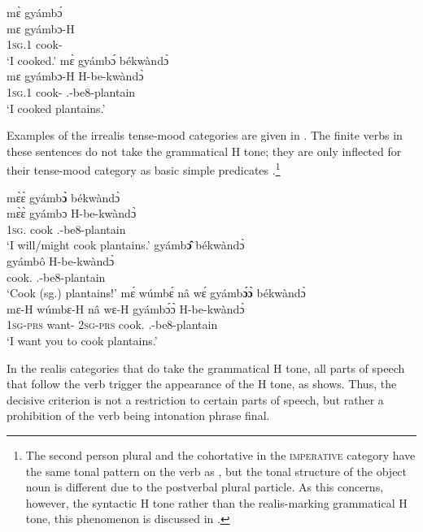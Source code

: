 \ea\label{metapst}
\ea  \label{metapst1}
  \glll  mɛ̀ gyámbɔ́  \\
          mɛ gyámbɔ-H \\
         1\textsc{sg}.{\PST}1 cook-{\PST}  \\
    \trans `I cooked.'
\ex\label{metapst2}
  \glll   mɛ̀ gyámbɔ́ békwàndɔ̀ \\
        mɛ gyámbɔ-H H-be-kwàndɔ̀ \\
          1\textsc{sg}.{\PST}1 cook-{\R} {\OBJ}.{\LINK}-be8-plantain\\
    \trans `I cooked plantains.'
\z
\z

Examples of the irrealis tense-mood categories are given in . The finite verbs in these sentences do not take the grammatical H tone; they are only inflected for their tense-mood category as basic simple predicates .\footnote{The second person plural and the cohortative in the \textsc{imperative} category have the same tonal pattern on the verb as , but the tonal structure of the object noun is different due to the postverbal plural particle. As this concerns, however, the syntactic H tone rather than the realis-marking grammatical H tone, this phenomenon is discussed in .}

\ea\label{noM}
\ea  \label{noM1}
  \glll  mɛ̀ɛ̀ gyámb{\bfseries ɔ̀} békwàndɔ̀ \\
          mɛ̀ɛ̀ gyámbɔ H-be-kwàndɔ̀ \\
         1\textsc{sg}.{\FUT} cook {\OBJ}.{\LINK}-be8-plantain\\
    \trans `I will/might cook plantains.'
\ex\label{noM2}
  \glll   gyámb{\bfseries ɔ̂} békwàndɔ̀ \\
        gyámbô H-be-kwàndɔ̀ \\
          cook.{\IMP} {\OBJ}.{\LINK}-be8-plantain\\
    \trans `Cook (sg.) plantains!'
\ex\label{noM3}
  \glll   mɛ́ wúmbɛ́ nâ wɛ́ gyámb{\bfseries ɔ́ɔ̀} békwàndɔ̀\\
         mɛ-H wúmbɛ-H nâ wɛ-H gyámbɔ́ɔ̀ H-be-kwàndɔ̀ \\
          1\textsc{sg}-\textsc{prs} want-{\R} {\COMP} 2\textsc{sg}-\textsc{prs} cook.{\SBJV} {\OBJ}.{\LINK}-be8-plantain\\
    \trans `I want you to cook plantains.'
\z
\z




In the realis categories that do take the grammatical H tone, all parts of speech that follow the verb trigger the appearance of the H tone, as  shows. Thus, the decisive criterion is not a restriction to certain parts of speech, but rather a prohibition of the verb being intonation phrase final.

